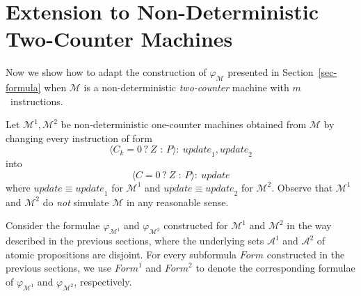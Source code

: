 \documentclass[a4paper,UKenglish,cleveref, autoref, thm-restate]{lipics-v2021}
\newcommand{\A}{\mathcal{A}}
\newcommand{\M}{\mathcal{M}}
\newcommand{\update}{\textit{update}}
\renewcommand{\Form}{\textit{Form}}
\begin{document}
 \section{Extension to Non-Deterministic Two-Counter Machines}
\label{sec-twocounter}

Now we show how to adapt the construction of $\varphi_\M$ presented in Section~\ref{sec-formula} when $\M$ is a non-deterministic \emph{two-counter} machine with $m$~instructions.

Let $\M^1,\M^2$ be non-deterministic one-counter machines obtained from $\M$ by changing every instruction of form
\[
    \langle C_k{=}0\, {?}\ Z \mbox{ : } P \rangle:\ \update_1, \update_2
\]
into 
\[
    \langle C{=}0\, {?}\ Z \mbox{ : } P \rangle:\ \update
\]
where $\update \equiv \update_1$ for $\M^1$ and $\update \equiv \update_2$ for $\M^2$. Observe that $\M^1$ and $\M^2$ do \emph{not} simulate $\M$ in any reasonable sense.

Consider the formulae $\varphi_{\M^1}$ and $\varphi_{\M^2}$ constructed for $\M^1$ and $\M^2$ in the way described in the previous sections, where the underlying sets $\A^1$ and $\A^2$ of atomic propositions are disjoint. For every subformula $\Form$ constructed in the previous sections, we use $\Form^1$ and $\Form^2$ to denote the corresponding formulae of  $\varphi_{\M^1}$ and $\varphi_{\M^2}$, respectively.
\end{document}
